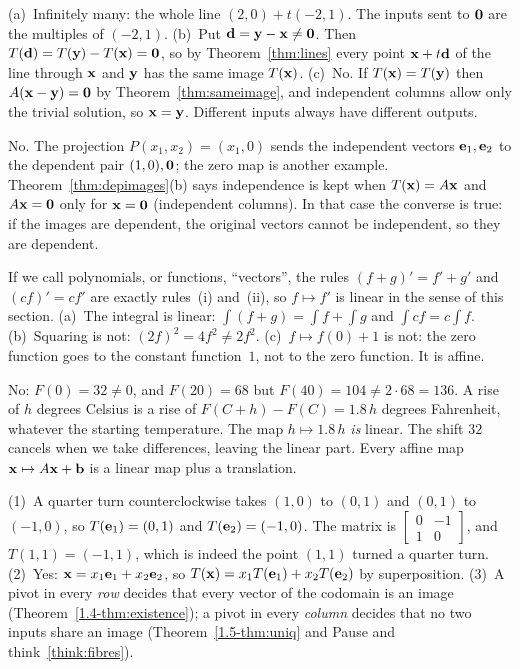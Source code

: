 \documentclass[11pt]{article}
\begin{document}
\begin{description}[leftmargin=0pt,itemsep=5pt]
  \item[Pause and think \ref{think:fibres}.] (a)~Infinitely many: the whole line $(2,0)+t(-2,1)$. The inputs sent to $\mathbf{0}$ are the multiples of $(-2,1)$. (b)~Put $\mathbf{d}=\mathbf{y}-\mathbf{x}\neq\mathbf{0}$. Then $T(\mathbf{d})=T(\mathbf{y})-T(\mathbf{x})=\mathbf{0}$, so by Theorem~\ref{thm:lines} every point $\mathbf{x}+t\mathbf{d}$ of the line through $\mathbf{x}$ and $\mathbf{y}$ has the same image $T(\mathbf{x})$. (c)~No. If $T(\mathbf{x})=T(\mathbf{y})$ then $A(\mathbf{x}-\mathbf{y})=\mathbf{0}$ by Theorem~\ref{thm:sameimage}, and independent columns allow only the trivial solution, so $\mathbf{x}=\mathbf{y}$. Different inputs always have different outputs.
  \item[Pause and think \ref{think:converse}.] No. The projection $P(x_1,x_2)=(x_1,0)$ sends the independent vectors $\mathbf{e}_1,\mathbf{e}_2$ to the dependent pair $(1,0),\mathbf{0}$; the zero map is another example. Theorem~\ref{thm:depimages}(b) says independence is kept when $T(\mathbf{x})=A\mathbf{x}$ and $A\mathbf{x}=\mathbf{0}$ only for $\mathbf{x}=\mathbf{0}$ (independent columns). In that case the converse is true: if the images are dependent, the original vectors cannot be independent, so they are dependent.
  \item[Pause and think \ref{think:calc}.] If we call polynomials, or functions, ``vectors'', the rules $(f+g)'=f'+g'$ and $(cf)'=cf'$ are exactly rules~(i) and~(ii), so $f\mapsto f'$ is linear in the sense of this section. (a)~The integral is linear: $\int(f+g)=\int f+\int g$ and $\int cf=c\int f$. (b)~Squaring is not: $(2f)^2=4f^2\neq2f^2$. (c)~$f\mapsto f(0)+1$ is not: the zero function goes to the constant function~$1$, not to the zero function. It is affine.
  \item[Pause and think \ref{think:affine}.] No: $F(0)=32\neq0$, and $F(20)=68$ but $F(40)=104\neq2\cdot68=136$. A rise of $h$ degrees Celsius is a rise of $F(C+h)-F(C)=1.8\,h$ degrees Fahrenheit, whatever the starting temperature. The map $h\mapsto1.8\,h$ \emph{is} linear. The shift $32$ cancels when we take differences, leaving the linear part. Every affine map $\mathbf{x}\mapsto A\mathbf{x}+\mathbf{b}$ is a linear map plus a translation.
  \item[Before the next section.] (1)~A quarter turn counterclockwise takes $(1,0)$ to $(0,1)$ and $(0,1)$ to $(-1,0)$, so $T(\mathbf{e}_1)=(0,1)$ and $T(\mathbf{e}_2)=(-1,0)$. The matrix is $\begin{bmatrix}0&-1\\1&0\end{bmatrix}$, and $T(1,1)=(-1,1)$, which is indeed the point $(1,1)$ turned a quarter turn. (2)~Yes: $\mathbf{x}=x_1\mathbf{e}_1+x_2\mathbf{e}_2$, so $T(\mathbf{x})=x_1T(\mathbf{e}_1)+x_2T(\mathbf{e}_2)$ by superposition. (3)~A pivot in every \emph{row} decides that every vector of the codomain is an image (Theorem~\ref{1.4-thm:existence}); a pivot in every \emph{column} decides that no two inputs share an image (Theorem~\ref{1.5-thm:uniq} and Pause and think~\ref{think:fibres}).
\end{description}
\end{document}
